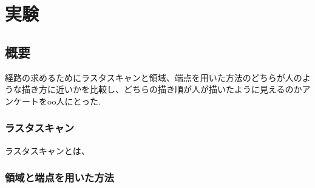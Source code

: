 \chapter{実験}
  \label{chap:experiment}
  \section{概要}
    \label{sec:summary}
	経路の求めるためにラスタスキャンと領域、端点を用いた方法のどちらが人のような描き方に近いかを比較し、どちらの描き順が人が描いたように見えるのかアンケートをoo人にとった.
	\subsection{ラスタスキャン}
	\label{subsec:rastascan}
	ラスタスキャンとは、
	\subsection{領域と端点を用いた方法}
	\label{subsec:mymethod}
